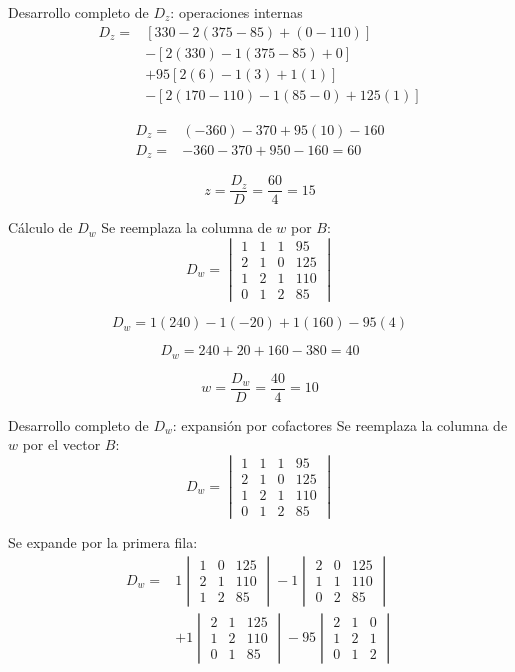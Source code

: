 \documentclass[aspectratio=169]{beamer}
\newcommand{\detm}[1]{\begin{vmatrix}#1\end{vmatrix}}
\begin{document}
\begin{frame}[shrink=13]{Desarrollo completo de $D_z$: operaciones internas}
\[
\begin{aligned}
D_z={}&[330-2(375-85)+(0-110)]\\
&-[2(330)-1(375-85)+0]\\
&+95[2(6)-1(3)+1(1)]\\
&-[2(170-110)-1(85-0)+125(1)]
\end{aligned}
\]

\[
\begin{aligned}
D_z={}&(-360)-370+95(10)-160\\
D_z={}&-360-370+950-160=\boxed{60}
\end{aligned}
\]

\[
z=\frac{D_z}{D}=\frac{60}{4}=\boxed{15}
\]
\end{frame}


\begin{frame}[shrink=8]{Cálculo de $D_w$}
Se reemplaza la columna de $w$ por $B$:
\[
D_w=\detm{
1&1&1&95\\
2&1&0&125\\
1&2&1&110\\
0&1&2&85}
\]

\[
D_w=1(240)-1(-20)+1(160)-95(4)
\]

\[
D_w=240+20+160-380=\boxed{40}
\]

\[
w=\frac{D_w}{D}=\frac{40}{4}=\boxed{10}
\]
\end{frame}

\begin{frame}[shrink=10]{Desarrollo completo de $D_w$: expansión por cofactores}
Se reemplaza la columna de $w$ por el vector $B$:
\[
D_w=\detm{
1&1&1&95\\
2&1&0&125\\
1&2&1&110\\
0&1&2&85}
\]

Se expande por la primera fila:
\[
\begin{aligned}
D_w={}&1\detm{1&0&125\\2&1&110\\1&2&85}
-1\detm{2&0&125\\1&1&110\\0&2&85}\\
&+1\detm{2&1&125\\1&2&110\\0&1&85}
-95\detm{2&1&0\\1&2&1\\0&1&2}
\end{aligned}
\]
\end{frame}
\end{document}
